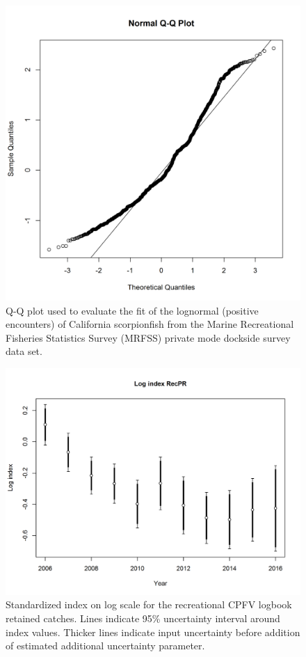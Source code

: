 \documentclass[12pt,]{article}
\begin{document}
\FloatBarrier 

\begin{figure}[htbp]
\centering
\includegraphics{Figures/Fleet4_RecPR_dockside_QQ.png}
\caption{Q-Q plot used to evaluate the fit of the lognormal (positive
encounters) of California scorpionfish from the Marine Recreational
Fisheries Statistics Survey (MRFSS) private mode dockside survey data
set. \label{fig:Fleet4_RecPR_dockside_QQ}}
\end{figure}

\begin{figure}[htbp]
\centering
\includegraphics{r4ss/plots_mod1/index4_logcpuedata_RecPR.png}
\caption{Standardized index on log scale for the recreational CPFV
logbook retained catches. Lines indicate 95\% uncertainty interval
around index values. Thicker lines indicate input uncertainty before
addition of estimated additional uncertainty parameter.
\label{fig:index4_logcpuedata_RecPR}}
\end{figure}
\end{document}
